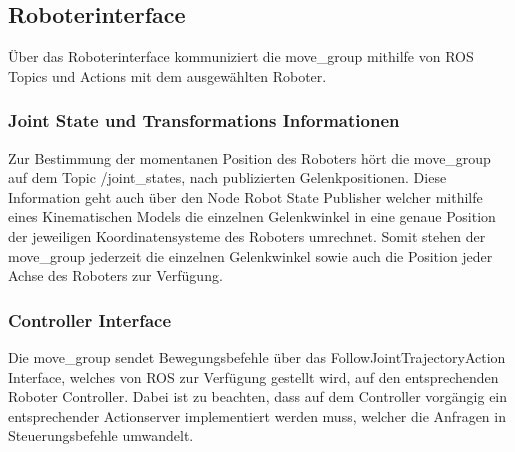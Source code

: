 \subsection{Roboterinterface}
Über das Roboterinterface kommuniziert die move\_group mithilfe von ROS Topics und Actions mit dem ausgewählten Roboter.

\subsubsection{Joint State  und Transformations Informationen}
Zur Bestimmung der momentanen Position des Roboters hört die move\_group auf dem Topic /joint\_states, nach publizierten Gelenkpositionen. Diese Information geht auch über den Node Robot State Publisher welcher mithilfe eines Kinematischen Models die einzelnen Gelenkwinkel in eine genaue Position der jeweiligen Koordinatensysteme des Roboters umrechnet. Somit stehen der move\_group jederzeit die einzelnen Gelenkwinkel sowie auch die Position jeder Achse des Roboters zur Verfügung.\cite{Joseph2015}

\subsubsection{Controller Interface}
Die move\_group sendet Bewegungsbefehle über das FollowJointTrajectoryAction Interface, welches von ROS zur Verfügung gestellt wird, auf den entsprechenden Roboter Controller. Dabei ist zu beachten, dass auf dem Controller vorgängig ein entsprechender Actionserver implementiert werden muss, welcher die Anfragen in Steuerungsbefehle umwandelt. \cite{Joseph2015}

